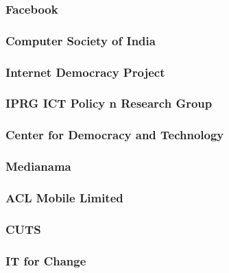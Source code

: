 \documentclass{article}
\begin{document}
\subsubsection{Facebook}


\subsubsection{Computer Society of India}


\subsubsection{Internet Democracy Project}


\subsubsection{IPRG ICT Policy n Research Group}


\subsubsection{Center for Democracy and Technology}


\subsubsection{Medianama}


\subsubsection{ACL Mobile Limited}


\subsubsection{CUTS}


\subsubsection{IT for Change}

\end{document}
